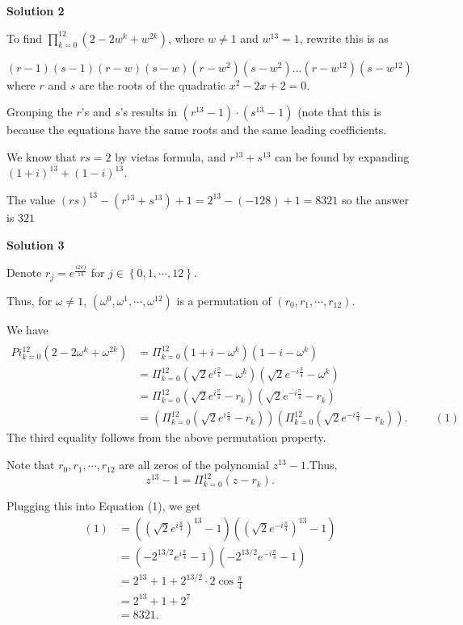\begin{enumerate}
\textbf{Solution 2}

To find $\prod_{k=0}^{12} (2 - 2w^k + w^{2k})$, where $w\neq1$ and $w^{13}=1$, rewrite this is as

 $(r-1)(s-1)(r-w)(s-w)(r-w^2)(s-w^2)...(r-w^{12})(s-w^{12})$ where $r$ and $s$ are the roots of the quadratic $x^2-2x+2=0$.

 Grouping the $r$'s and $s$'s results in $(r^{13}-1) \cdot (s^{13}-1)$ (note that this is because the equations have the same roots and the same leading coefficients.

 We know that $rs=2$ by vietas formula, and $r^{13} + s^{13}$ can be found by expanding $(1+i)^{13}+(1-i)^{13}$.

 The value $(rs)^{13} - (r^{13} + s^{13}) + 1 = 2^{13} - (-128) + 1= 8321$ so the answer is $\boxed{321}$




\textbf{Solution 3}

Denote $r_j = e^{\frac{i 2 \pi j}{13}}$ for $j \in \left\{ 0, 1, \cdots , 12 \right\}$.

 Thus, for $\omega \neq 1$, $\left( \omega^0, \omega^1, \cdots, \omega^{12} \right)$ is a permutation of $\left( r_0, r_1, \cdots, r_{12} \right)$.

 We have\begin{align*}\\Pi_{k = 0}^{12} \left( 2 - 2 \omega^k + \omega^{2k} \right)& = \Pi_{k=0}^{12} \left( 1 + i - \omega^k \right)\left( 1 - i - \omega^k \right) \\& = \Pi_{k=0}^{12} \left( \sqrt{2} e^{i \frac{\pi}{4}} - \omega^k \right)\left( \sqrt{2} e^{-i \frac{\pi}{4}} - \omega^k \right) \\& = \Pi_{k=0}^{12} \left( \sqrt{2} e^{i \frac{\pi}{4}} - r_k \right)\left( \sqrt{2} e^{-i \frac{\pi}{4}} - r_k \right) \\& = \left(\Pi_{k=0}^{12} \left( \sqrt{2} e^{i \frac{\pi}{4}} - r_k \right)\right)\left(\Pi_{k=0}^{12} \left( \sqrt{2} e^{-i \frac{\pi}{4}} - r_k \right)\right) . \hspace{1cm} (1)\end{align*}
The third equality follows from the above permutation property.

 Note that $r_0, r_1, \cdots , r_{12}$ are all zeros of the polynomial $z^{13} - 1$.Thus,
 \[ z^{13} - 1 = \Pi_{k=0}^{12} \left( z - r_k \right) . \]

 Plugging this into Equation (1), we get\begin{align*}(1)& = \left( \left( \sqrt{2} e^{i \frac{\pi}{4}} \right)^{13} - 1 \right)\left( \left( \sqrt{2} e^{-i \frac{\pi}{4}} \right)^{13} - 1 \right) \\& = \left( - 2^{13/2} e^{i \frac{\pi}{4}} - 1 \right)\left( - 2^{13/2} e^{-i \frac{\pi}{4}} - 1 \right) \\& = 2^{13} + 1 + 2^{13/2} \cdot 2 \cos \frac{\pi}{4} \\& = 2^{13} + 1 + 2^7 \\& = 8321 .\end{align*}



\end{enumerate}
